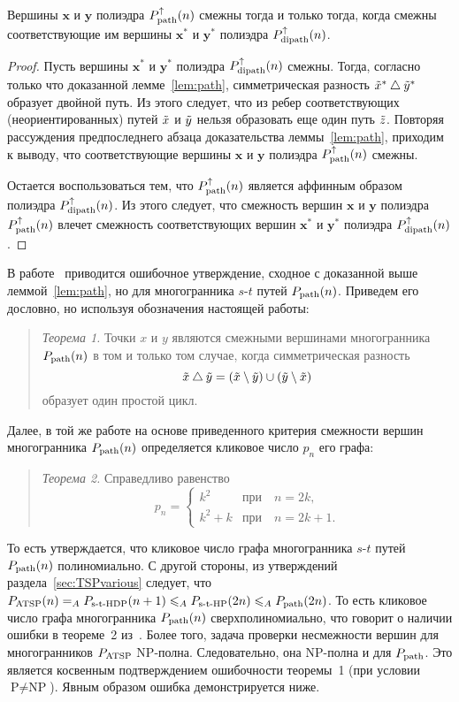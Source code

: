 \begin{lemma} 
\label{lem:path2}
Вершины $\bm{x}$ и $\bm{y}$ полиэдра $P_{\textup{path}}^{\uparrow}(n)$ смежны тогда и только тогда,
когда смежны соответствующие им вершины $\bm{x^*}$ и $\bm{y^*}$ полиэдра $P_{\textup{dipath}}^{\uparrow}(n)$.
\end{lemma}
\begin{proof}
Пусть вершины $\bm{x^*}$ и $\bm{y^*}$ полиэдра $P_{\textup{dipath}}^{\uparrow}(n)$ смежны. Тогда, согласно только что доказанной лемме~\ref{lem:path}, симметрическая разность $\tilde{x}^* \bigtriangleup \tilde{y}^*$ образует двойной путь. Из этого следует, что из ребер соответствующих (неориентированных) путей $\tilde x$ и $\tilde y$ нельзя образовать еще один путь $\tilde z$. Повторяя рассуждения предпоследнего абзаца доказательства леммы~\ref{lem:path}, приходим к выводу, что соответствующие вершины $\bm{x}$ и $\bm{y}$ полиэдра $P_{\textup{path}}^{\uparrow}(n)$ смежны.

Остается воспользоваться тем, что $P_{\textup{path}}^{\uparrow}(n)$ является аффинным образом полиэдра $P_{\textup{dipath}}^{\uparrow}(n)$. Из этого следует, что смежность вершин $\bm{x}$ и $\bm{y}$ полиэдра $P_{\textup{path}}^{\uparrow}(n)$ влечет смежность соответствующих вершин $\bm{x^*}$ и $\bm{y^*}$ полиэдра $P_{\textup{dipath}}^{\uparrow}(n)$.
\end{proof}

В работе~\cite{Bondarenko:1993SW3A} приводится ошибочное утверждение, сходное с доказанной выше леммой~\ref{lem:path}, но для многогранника $s$-$t$ путей $P_{\textup{path}}(n)$. 
Приведем его дословно, но используя обозначения настоящей работы:
\begin{quote} %
	\textit{Теорема 1.}
	Точки $x$ и $y$ являются смежными вершинами многогранника $P_{\textup{path}}(n)$ в том и только том случае, когда симметрическая разность 
	$$
	\tilde x \bigtriangleup \tilde y = 
	(\tilde x \setminus \tilde y) \cup (\tilde y \setminus \tilde x)
	$$
	образует один простой цикл.
\end{quote}
Далее, в той же работе на основе приведенного критерия смежности вершин многогранника $P_{\textup{path}}(n)$ определяется кликовое число $p_n$ его графа:
\begin{quote} %
	\textit{Теорема 2.} 
	Справедливо равенство
		$$
		p_n=\left\{
		\begin{array}{ll}
		k^2     &\mbox{при} \quad n=2k, \\
		k^2+k   &\mbox{при} \quad n=2k+1.
		\end{array}
		\right.
		$$
\end{quote}
То есть утверждается, что кликовое число графа многогранника $s$-$t$ путей $P_{\textup{path}}(n)$ полиномиально. С другой стороны, из утверждений раздела~\ref{sec:TSPvarious} следует, что $P_{\textup{ATSP}}(n) =_A P_{\textup{s-t-HDP}}(n+1) \leqslant_A P_{\textup{s-t-HP}}(2n) \leqslant_A P_{\textup{path}}(2n)$. То есть кликовое число графа многогранника $P_{\textup{path}}(n)$ сверхполиномиально, что говорит о наличии ошибки в теореме~2 из~\cite{Bondarenko:1993SW3A}. Более того, задача проверки несмежности вершин для многогранников $P_{\textup{ATSP}}$ NP-полна. Следовательно, она NP-полна и для $P_{\textup{path}}$. Это является косвенным подтверждением ошибочности теоремы~1 (при условии $\text{P} \ne \text{NP}$). Явным образом ошибка демонстрируется ниже.

